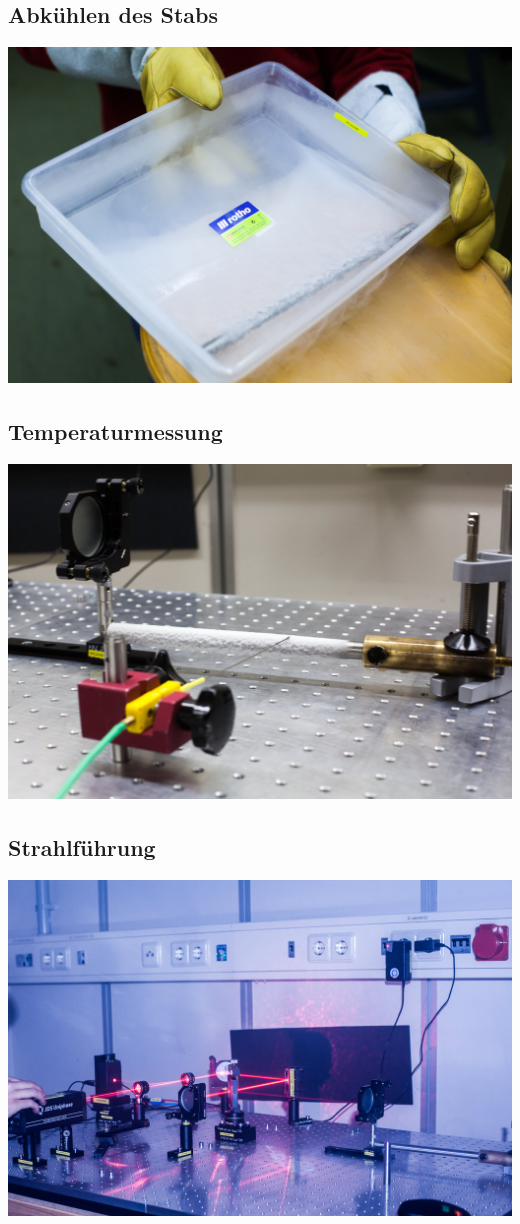 \subsection*{Abkühlen des Stabs}
\begin{frame}
	\includegraphics[width=\textwidth]{images/2/interferrometer-1}
\end{frame}
\subsection*{Temperaturmessung}
\begin{frame}
	\includegraphics[width=\textwidth]{images/2/interferrometer-2}
\end{frame}
\subsection*{Strahlführung}
\begin{frame}
	\includegraphics[width=\textwidth]{images/2/interferrometer-6}
\end{frame}
